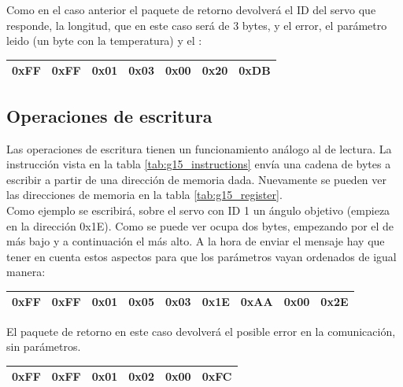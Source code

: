 	Como en el caso anterior el paquete de retorno devolverá el ID del servo que responde, la longitud, que en este caso será de 3 bytes, y el error, el parámetro leido (un byte con la temperatura) y el :

	\begin{center}
		\begin{tabular}{|c|c|c|c|c|c|c|}
			\hline
			0xFF & 0xFF & 0x01 & 0x03 & 0x00 & 0x20 & 0xDB \\
			\hline
		\end{tabular}
	\end{center}

	\subsection{Operaciones de escritura} \label{subsec:registros:operaciones:escritura}

	Las operaciones de escritura tienen un funcionamiento análogo al de lectura. La instrucción  vista en la tabla \ref{tab:g15_instructions} envía una cadena de bytes a escribir a partir de una dirección de memoria dada. Nuevamente se pueden ver las direcciones de memoria en la tabla \ref{tab:g15_register}.
	\\

	Como ejemplo se escribirá, sobre el servo con ID 1 un ángulo objetivo (empieza en la dirección 0x1E). Como se puede ver ocupa dos bytes, empezando por el de más bajo y a continuación el más alto. A la hora de enviar el mensaje hay que tener en cuenta estos aspectos para que los parámetros vayan ordenados de igual manera:

	\begin{center}
		\begin{tabular}{|c|c|c|c|c|c|c|c|c|}
			\hline
			0xFF & 0xFF & 0x01 & 0x05 & 0x03 & 0x1E & 0xAA & 0x00 &0x2E  \\
			\hline
		\end{tabular}
	\end{center}

	El paquete de retorno en este caso devolverá el posible error en la comunicación, sin parámetros.
	\begin{center}
		\begin{tabular}{|c|c|c|c|c|c|}
			\hline
			0xFF & 0xFF & 0x01 & 0x02 & 0x00 & 0xFC \\
			\hline
		\end{tabular}
	\end{center}

